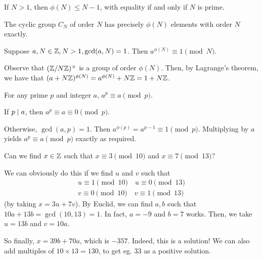 \documentclass{article}
\begin{document}
\begin{corollary}
	If $N > 1$, then $\phi(N) \leq N-1$, with equality if and only if $N$ is prime.
\end{corollary}

\begin{corollary}
	The cyclic group $C_N$ of order $N$ has precisely $\phi(N)$ elements with order $N$ exactly.
\end{corollary}

\begin{theorem}
	\label{euler-fermat}
	Suppose $a, N \in \mathbb{Z}, N > 1, \gcd (a, N) = 1$. Then $a^{\phi(N)} \equiv 1 \pmod{N}$.
\end{theorem}

\begin{prf}
    Observe that $(\mathbb{Z}/N\mathbb{Z})^\times$ is a group of order $\phi(N)$. Then, by Lagrange's theorem, we have that $(a + N\mathbb{Z})^{\phi(N)} = a^{\phi(N)} + N\mathbb{Z} = 1 + N\mathbb{Z}$.
\end{prf}

\begin{theorem}
	\label{fermats-little-theorem}
    For any prime $p$ and integer $a$, $a^p \equiv a \pmod{p}$.
\end{theorem}

\begin{prf}
	If $p \mid a$, then $a^p \equiv a \equiv 0 \pmod{p}$.
	
	Otherwise, $\gcd (a, p) = 1$. Then $a^{\phi(p)} = a^{p-1} \equiv 1 \pmod{p}$. Multiplying by $a$ yields $a^p \equiv a \pmod{p}$ exactly as required.
\end{prf}

\begin{example}
	Can we find $x \in \mathbb{Z}$ such that $x \equiv 3 \pmod{10}$ and $x \equiv 7 \pmod{13}$?
	
	We can obviously do this if we find $u$ and $v$ such that
	\begin{align*}
	u \equiv 1 \pmod{10} \quad u \equiv 0 \pmod{13} \\
	v \equiv 0 \pmod{10} \quad v \equiv 1 \pmod{13}
	\end{align*}
	(by taking $x = 3u + 7v$). By Euclid, we can find $a, b$ such that $10a + 13b = \gcd (10, 13) = 1$. In fact, $a = -9$ and $b = 7$ works. Then, we take $u = 13b$ and $v = 10a$.
	
	So finally, $x = 39b + 70a$, which is $-357$. Indeed, this is a solution! We can also add multiples of $10 \times 13 = 130$, to get eg. $33$ as a positive solution.
\end{example}
\end{document}
